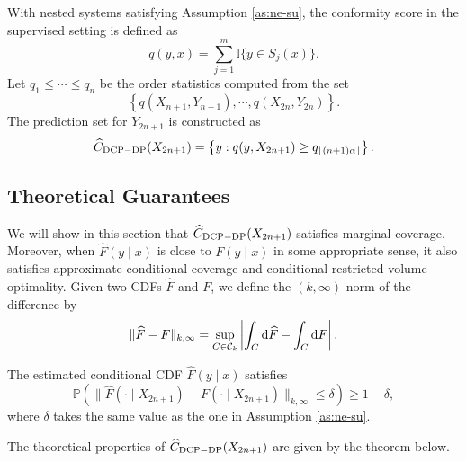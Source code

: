 With nested systems satisfying Assumption \ref{as:ne-su}, the conformity score in the supervised setting is defined as
\begin{equation*}
q(y,x) = \sum_{j=1}^m\mathbb{I}\{y\in S_j(x)\}.
\end{equation*}
Let $q_1\leq \cdots\leq q_n$ be the order statistics computed from the set
\begin{equation*}
\left\{q(X_{n+1},Y_{n+1}),\cdots, q(X_{2n},Y_{2n})\right\}.
\end{equation*}
The prediction set for $Y_{2n+1}$ is constructed as
\begin{equation*}
\widehat{C}_{\rm DCP-DP}(X_{2n+1}) = \left\{y: q(y,X_{2n+1})\geq q_{\lfloor(n+1)\alpha\rfloor}\right\}. \label{eq:dcp-dp}
\end{equation*}

\subsection{Theoretical Guarantees}\label{sec:theory}

We will show in this section that $\widehat{C}_{\rm DCP-DP}(X_{2n+1})$ satisfies marginal coverage. Moreover, when $\widehat{F}(y\mid x)$ is close to $F(y\mid x)$ in some appropriate sense, it also satisfies approximate conditional coverage and conditional restricted volume optimality. Given two CDFs $\widehat{F}$ and $F$, we define the $(k,\infty)$ norm of the difference by
$$\|\widehat{F}-F\|_{k,\infty}=\sup_{C\in\mathcal{C}_k}\left|\int_C\mathrm{d}\widehat{F}-\int_C\mathrm{d}F\right|.$$

\begin{assumption}\label{ass:F}
The estimated conditional CDF $\widehat{F}(y \mid x)$ satisfies 
$$\mathbb{P}\left(\|\widehat{F}(\cdot \mid X_{2n+1})-F(\cdot \mid X_{2n+1})\|_{k,\infty}\leq\delta\right)\geq 1-\delta,$$
where $\delta$ takes the same value as the one in Assumption \ref{as:ne-su}.
\end{assumption}

The theoretical properties of $\widehat{C}_{\rm DCP-DP}(X_{2n+1})$ are given by the theorem below.


